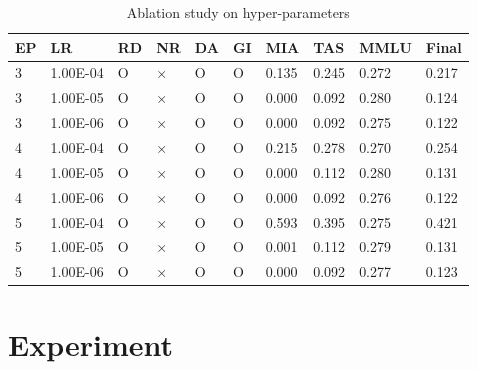 \documentclass[11pt]{article}
\begin{document}
\begin{table}[t]
  \centering
    \begin{tabular}{|l|l|l|l|l|l|l|l|l|l|}
    \hline
        EP & LR & RD & NR & DA & GI & MIA & TAS & MMLU & Final \\ \hline
        3 & 1.00E-04 & O & × & O & O & 0.135 & 0.245 & 0.272 & 0.217 \\ \hline
        3 & 1.00E-05 & O & × & O & O & 0.000 & 0.092 & 0.280 & 0.124 \\ \hline
        3 & 1.00E-06 & O & × & O & O & 0.000 & 0.092 & 0.275 & 0.122 \\ \hline
        4 & 1.00E-04 & O & × & O & O & 0.215 & 0.278 & 0.270 & 0.254 \\ \hline
        4 & 1.00E-05 & O & × & O & O & 0.000 & 0.112 & 0.280 & 0.131 \\ \hline
        4 & 1.00E-06 & O & × & O & O & 0.000 & 0.092 & 0.276 & 0.122 \\ \hline
        5 & 1.00E-04 & O & × & O & O & 0.593 & 0.395 & 0.275 & 0.421 \\ \hline
        5 & 1.00E-05 & O & × & O & O & 0.001 & 0.112 & 0.279 & 0.131 \\ \hline
        5 & 1.00E-06 & O & × & O & O & 0.000 & 0.092 & 0.277 & 0.123 \\ \hline
    \end{tabular}
  \caption{
    Ablation study on hyper-parameters }
\label{tab:AS1}
\end{table}



\section{Experiment}


\end{document}
